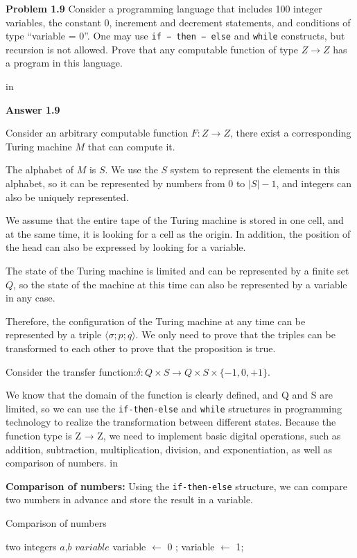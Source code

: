 \documentclass[11pt]{article}
\begin{document}
\newpage
{\bf Problem 1.9} Consider a programming language that includes 100 integer variables, the constant 0, increment and decrement statements, and conditions of type ``variable = 0''. One may
use \verb|if − then − else| and \verb|while| constructs, but recursion is not allowed. Prove that any computable function of type $Z \to Z$ has a program in this language.

 in

{\bf Answer 1.9 } 

Consider an arbitrary computable function $F:Z\to Z$, there exist a corresponding Turing machine $M$ that can compute it.

The alphabet of $M$ is $S$. We use the $S$ system to represent the elements in this alphabet, so it can be represented by numbers from $0$ to $|S|-1$, and integers can also be uniquely represented.

We assume that the entire tape of the Turing machine is stored in one cell, and at the same time, it is looking for a cell as the origin. In addition, the position of the head can also be expressed by looking for a variable.

The state of the Turing machine is limited and can be represented by a finite set $Q$, so the state of the machine at this time can also be represented by a variable in any case.

Therefore, the configuration of the Turing machine at any time can be represented by a triple $\langle \sigma;p;q\rangle$. We only need to prove that the triples can be transformed to each other to prove that the proposition is true.

Consider the transfer function:$\delta:Q\times S\to Q\times S\times\{-1,0,+1\}$.

We know that the domain of the function is clearly defined, and Q and S are limited, so we can use the \verb|if-then-else| and \verb|while| structures in programming technology to realize the transformation between different states. Because the function type is Z → Z, we need to implement basic digital operations, such as addition, subtraction, multiplication, division, and exponentiation, as well as comparison of numbers.
 in

{\bf Comparison of numbers:} Using the \verb|if-then-else| structure, we can compare two numbers in advance and store the result in a variable.
\begin{algorithm}[!h]  
	\caption{Comparison of numbers}  
	\label{alg:Framwork}  
	\begin{algorithmic}  
		\Require  
		two integers $a$,$b$
		\Ensure
		$variable$
		\State variable $\gets$ 0 ;
		\Else
		\State variable $\gets$ 1;
		\EndIf
	\end{algorithmic}  
\end{algorithm}
\end{document}
